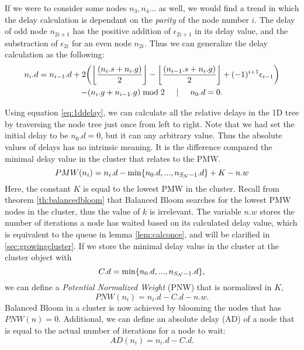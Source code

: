 If we were to consider some nodes $n_3, n_4...$ as well, we would find a trend in which the delay calculation is dependant on the \emph{parity} of the node number $i$. The delay of odd node $n_{2i+1}$ has the positive addition of $\epsilon_{2i+1}$ in its delay value, and the substraction of $\epsilon_{2i}$ for an even node $n_{2i}$. Thus we can generalize the delay calculation as the following:
\begin{multline}\label{eq:1ddelay}
n_i.d = n_{i-1}.d + 2\bigg({\left \lfloor \frac{(n_i.s+n_i.g)}{2} \right \rfloor } - {\left \lfloor \frac{(n_{i-1}.s+n_i.g)}{2} \right \rfloor } + (-1)^{i+1}\epsilon_{i-1}\bigg) \\
         - (n_{i}.g + n_{i-1}.g)\bmod 2 \hspace{.5cm} | \hspace{.5cm} n_0.d = 0.
\end{multline}

Using equation \ref{eq:1ddelay}, we can calculate all the relative delays in the 1D tree by traversing the node tree just once from left to right. Note that we had set the initial delay to be $n_0.d=0$, but it can any arbitrary value. Thus the absolute values of delays has no intrinsic meaning. It is the difference compared the minimal delay value in the cluster that relates to the PMW.
\begin{equation}\label{eq:pmw}
  PMW(n_i) = n_i.d - \min \{n_0.d,...,n_{S_{\mathcal{N}}-1}.d\} + K - n.w
\end{equation}
Here, the constant $K$ is equal to the lowest PMW in the cluster. Recall from theorem \ref{th:balancedbloom} that Balanced Bloom searches for the lowest PMW nodes in the cluster, thus the value of $k$ is irrelevant. The variable $n.w$ stores the number of iterations a node has waited based on its calculated delay value, which is equivalent to the queue in lemma \ref{lem:calconce}, and will be clarified in \ref{sec:growingcluster}. If we store the minimal delay value in the cluster at the cluster object with
\begin{equation}\label{eq:cd}
  C.d = \min \{n_0.d,...,n_{S_{\mathcal{N}}-1}.d\},
\end{equation}
we can define a \emph{Potential Normalized Weight} (PNW) that is normalized in $K$,
\begin{equation}\label{eq:pnw}
  PNW(n_i) = n_i.d - C.d - n.w.
\end{equation}
Balanced Bloom in a cluster is now achieved by blooming the nodes that has $PNW(n) = 0$. Additional, we can define an absolute delay (AD) of a node that is equal to the actual number of iterations for a node to wait:
\begin{equation}\label{eq:ad}
  AD(n_i) = n_i.d - C.d.
\end{equation}


